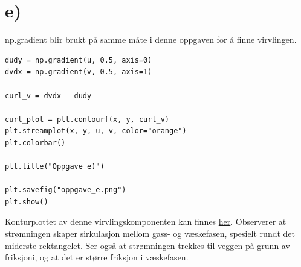 \documentclass[a4paper,10pt,norsk]{article}
\begin{document}
	\section*{e)}\label{ass:e}
	np.gradient blir brukt på samme måte i denne oppgaven for å finne virvlingen.
	\begin{lstlisting}
dudy = np.gradient(u, 0.5, axis=0)
dvdx = np.gradient(v, 0.5, axis=1)

curl_v = dvdx - dudy

curl_plot = plt.contourf(x, y, curl_v)
plt.streamplot(x, y, u, v, color="orange")
plt.colorbar()

plt.title("Oppgave e)")

plt.savefig("oppgave_e.png")
plt.show()
	\end{lstlisting}
	Konturplottet av denne virvlingskomponenten kan finnes \hyperref[fig:e]{her}. 
	Observerer at strømningen skaper sirkulasjon mellom gass- og væskefasen, spesielt rundt det miderste rektangelet. 
	Ser også at strømningen trekkes til veggen på grunn av friksjoni, og at det er større friksjon i væskefasen. 
\end{document}
